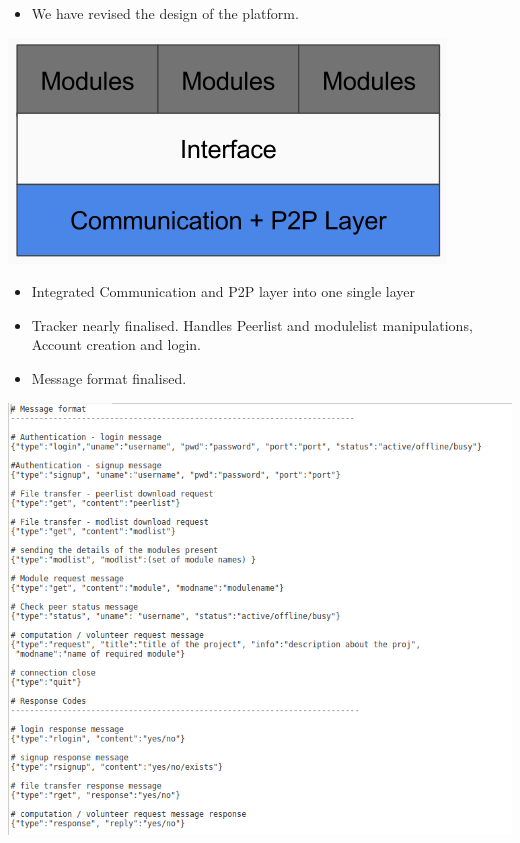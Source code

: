 \documentclass{beamer}
\begin{document}
\begin{frame}{}
\begin{itemize}
\item We have revised the design of the platform.
\end{itemize}
\begin{center}
\includegraphics[scale=0.35]{pic2}
\end{center}
\begin{itemize}
\item Integrated Communication and P2P layer into one single layer
\end{itemize}
\begin{itemize}
\item Tracker nearly finalised. Handles Peerlist and modulelist
 manipulations, Account creation and login.
\end{itemize}
\end{frame}

\begin{frame}{}
\begin{center}
\begin{itemize}
\item Message format finalised.
\end{itemize}
\includegraphics[scale=0.35]{msg}
\end{center}
\end{frame}
\end{document}
